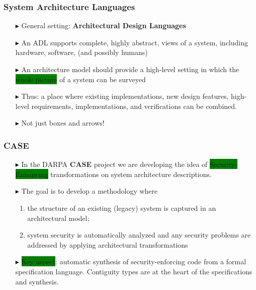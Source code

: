 \documentclass{beamer}
\newcommand{\gemph}[1]{\colorbox{green}{#1}}
\begin{document}
\begin{frame}\frametitle{System Architecture Languages}
\begin{itemize}

\item [$\blacktriangleright$] General setting: \textbf{Architectural Design Languages}

\item [$\blacktriangleright$] An ADL supports complete, highly abstract, views of a system,
  including hardware, software, (and possibly humans)

\item [$\blacktriangleright$] An architecture model should provide a high-level setting in which
  the \gemph{whole picture} of a system can be surveyed

\item [$\blacktriangleright$] Thus: a place where existing
  implementations, new design features, high-level requirements,
  implementations, and verifications can be combined.

\item [$\blacktriangleright$] Not just boxes and arrows!

\end{itemize}

\end{frame}

\begin{frame}\frametitle{CASE}
\begin{itemize}

\item [$\blacktriangleright$] In the DARPA \textbf{CASE} project we
  are developing the idea of \gemph{Security-Enhancing}
  transformations on system architecture descriptions.

\item [$\blacktriangleright$] The goal is to develop a methodology where
  \begin{enumerate}

  \item the structure of an existing (legacy) system is captured in an
    architectural model;

 \item system security is automatically analyzed and any security
   problems are addressed by applying architectural transformations

  \end{enumerate}

\item [$\blacktriangleright$] \gemph{Key aspect}: automatic synthesis of
  security-enforcing code from a formal specification
  language. Contiguity types are at the heart of the specifications
  and synthesis.

\end{itemize}

\end{frame}
\end{document}
